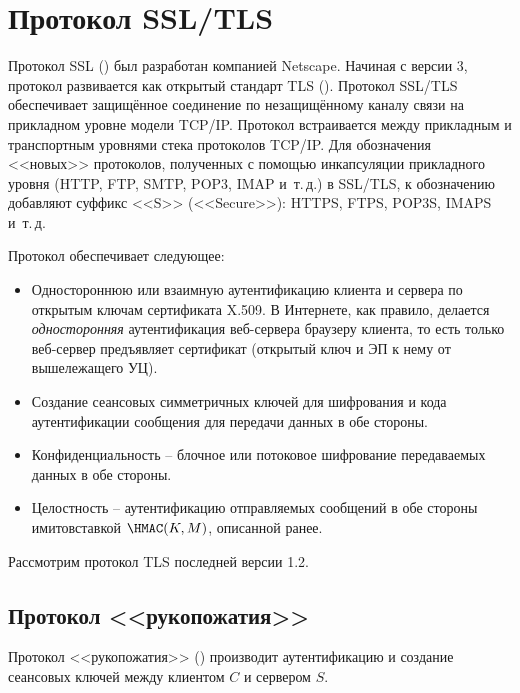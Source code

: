 \section{Протокол SSL/TLS}

Протокол SSL () был разработан компанией Netscape. Начиная с версии 3, протокол развивается как открытый стандарт TLS (). Протокол SSL/TLS обеспечивает защищённое соединение по незащищённому каналу связи на прикладном уровне модели TCP/IP. Протокол встраивается между прикладным и транспортным уровнями стека протоколов TCP/IP. Для обозначения <<новых>> протоколов, полученных с помощью инкапсуляции прикладного уровня (HTTP, FTP, SMTP, POP3, IMAP и~т.\,д.) в SSL/TLS, к обозначению добавляют суффикс <<S>> (<<Secure>>): HTTPS, FTPS, POP3S, IMAPS и~т.\,д.

Протокол обеспечивает следующее:
\begin{itemize}
    \item Одностороннюю или взаимную аутентификацию клиента и сервера по открытым ключам сертификата X.509. В Интернете, как правило, делается \emph{односторонняя} аутентификация веб-сервера браузеру клиента, то есть только веб-сервер предъявляет сертификат (открытый ключ и ЭП к нему от вышележащего УЦ).
    \item Создание сеансовых симметричных ключей для шифрования и кода аутентификации сообщения для передачи данных в обе стороны.
    \item Конфиденциальность -- блочное или потоковое шифрование передаваемых данных в обе стороны.
    \item Целостность -- аутентификацию отправляемых сообщений в обе стороны имитовставкой $\HMAC(K,M)$, описанной ранее.
\end{itemize}

Рассмотрим протокол TLS последней версии 1.2.


\subsection{Протокол <<рукопожатия>>}

Протокол <<рукопожатия>> () производит аутентификацию и создание сеансовых ключей между клиентом $C$ и сервером $S$.

